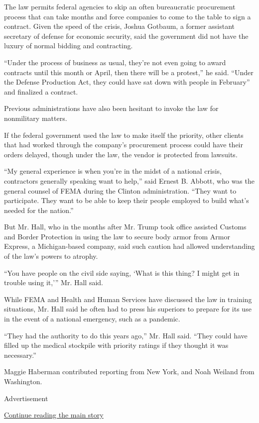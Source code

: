 The law permits federal agencies to skip an often bureaucratic
procurement process that can take months and force companies to come to
the table to sign a contract. Given the speed of the crisis, Joshua
Gotbaum, a former assistant secretary of defense for economic security,
said the government did not have the luxury of normal bidding and
contracting.

``Under the process of business as usual, they're not even going to
award contracts until this month or April, then there will be a
protest,'' he said. ``Under the Defense Production Act, they could have
sat down with people in February'' and finalized a contract.

Previous administrations have also been hesitant to invoke the law for
nonmilitary matters.

If the federal government used the law to make itself the priority,
other clients that had worked through the company's procurement process
could have their orders delayed, though under the law, the vendor is
protected from lawsuits.

``My general experience is when you're in the midst of a national
crisis, contractors generally speaking want to help,'' said Ernest B.
Abbott, who was the general counsel of FEMA during the Clinton
administration. ``They want to participate. They want to be able to keep
their people employed to build what's needed for the nation.''

But Mr. Hall, who in the months after Mr. Trump took office assisted
Customs and Border Protection in using the law to secure body armor from
Armor Express, a Michigan-based company, said such caution had allowed
understanding of the law's powers to atrophy.

``You have people on the civil side saying, `What is this thing? I might
get in trouble using it,''' Mr. Hall said.

While FEMA and Health and Human Services have discussed the law in
training situations, Mr. Hall said he often had to press his superiors
to prepare for its use in the event of a national emergency, such as a
pandemic.

``They had the authority to do this years ago,'' Mr. Hall said. ``They
could have filled up the medical stockpile with priority ratings if they
thought it was necessary.''

Maggie Haberman contributed reporting from New York, and Noah Weiland
from Washington.

Advertisement

\protect\hyperlink{after-bottom}{Continue reading the main story}

